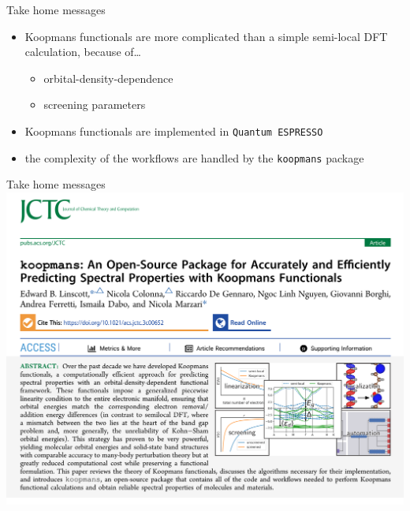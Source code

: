 \documentclass[xcolor=table,aspectratio=169]{beamer}
\numberwithin{equation}{section}
\begin{document}
\begin{frame}{Take home messages}

   \begin{center}
   \end{center}

   \begin{itemize}
      \item Koopmans functionals are more complicated than a simple semi-local DFT calculation, because of\dots
      \begin{itemize}
         \item orbital-density-dependence
         \item screening parameters
      \end{itemize}
      \item Koopmans functionals are implemented in \texttt{Quantum ESPRESSO}
      \item the complexity of the workflows are handled by the \texttt{koopmans} package
   \end{itemize}

\end{frame}

\begin{frame}{Take home messages}
   \includegraphics[width=\textwidth]{figures/jctc.png}
\end{frame}
\end{document}
